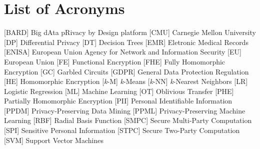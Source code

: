 %

\chapter*{List of Acronyms}
%
\begin{acronym}


 [BARD] {Big dAta pRivacy by Design platform}
 [CMU] {Carnegie Mellon University}
 [DP] {Differential Privacy}
 [DT] {Decision Trees}
 [EMR] {Eletronic Medical Records}
 [ENISA] {European Union Agency for Network and Information Security}
 [EU] {European Union}
 [FE] {Functional Encryption}
 [FHE] {Fully Homomorphic Encryption}
 [GC] {Garbled Circuits}
 [GDPR] {General Data Protection Regulation}
 [HE] {Homomorphic Encryption}
 [\textit{k}-M] {\textit{k}-Means}
 [\textit{k}-NN] {\textit{k}-Nearest Neighbors}
 [LR] {Logistic Regression}
 [ML] {Machine Learning}
 [OT] {Oblivious Transfer}
 [PHE] {Partially Homomorphic Encryption}
 [PII] {Personal Identifiable Information}
 [PPDM] {Privacy-Preserving Data Mining}
 [PPML] {Privacy-Preserving Machine Learning}
 [RBF] {Radial Basis Function}
 [SMPC] {Secure Multi-Party Computation}
 [SPI] {Sensitive Personal Information}
 [STPC] {Secure Two-Party Computation}
 [SVM] {Support Vector Machines}

\end{acronym}

\cleardoublepage
